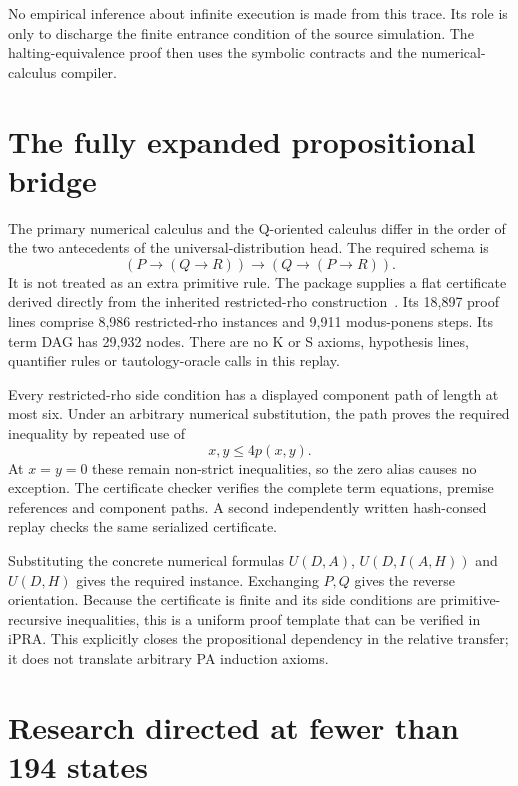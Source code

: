 \documentclass[11pt,letterpaper]{article}
\begin{document}
No empirical inference about infinite execution is made from this trace.
Its role is only to discharge the finite entrance condition of the source
simulation. The halting-equivalence proof then uses the symbolic contracts
and the numerical-calculus compiler.



\section{The fully expanded propositional bridge}
\label{sec:exchange}

The primary numerical calculus and the Q-oriented calculus differ in
the order of the two antecedents of the universal-distribution head.
The required schema is
\[
             (P\to(Q\to R))\to(Q\to(P\to R)).
\]
It is not treated as an extra primitive rule. The package supplies a
flat certificate derived directly from the inherited restricted-rho
construction~\cite{restricted}. Its 18,897 proof lines comprise 8,986
restricted-rho instances and 9,911 modus-ponens steps. Its term DAG has
29,932 nodes. There are no K or S axioms, hypothesis lines, quantifier
rules or tautology-oracle calls in this replay.

Every restricted-rho side condition has a displayed component path of
length at most six. Under an arbitrary numerical substitution, the path
proves the required inequality by repeated use of
\[
                         x,y\le 4p(x,y).
\]
At $x=y=0$ these remain non-strict inequalities, so the zero alias causes
no exception. The certificate checker verifies the complete term equations,
premise references and component paths. A second independently written
hash-consed replay checks the same serialized certificate.

Substituting the concrete numerical formulas $U(D,A)$, $U(D,I(A,H))$ and
$U(D,H)$ gives the required instance. Exchanging $P,Q$ gives the reverse
orientation. Because the certificate is finite and its side conditions
are primitive-recursive inequalities, this is a uniform proof template
that can be verified in iPRA. This explicitly closes the propositional
dependency in the relative transfer; it does not translate arbitrary PA
induction axioms.

\section{Research directed at fewer than 194 states}
\label{sec:search}
\end{document}
